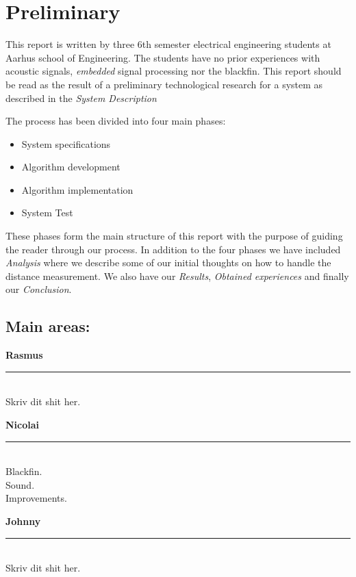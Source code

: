 \chapter{Preliminary}
This report is written by three 6th semester electrical engineering students at Aarhus school of Engineering. The students have no prior experiences with acoustic signals, \textit{embedded} signal processing nor the blackfin. This report should be read as the result of a preliminary technological research for a system as described in the \textit{System Description}

The process has been divided into four main phases:
\begin{itemize}
\item System specifications
\item Algorithm development
\item Algorithm implementation
\item System Test
\end{itemize}

These phases form the main structure of this report with the purpose of guiding the reader through our process. In addition to the four phases we have included \textit{Analysis} where we describe some of our initial thoughts on how to handle the distance measurement. We also have our \textit{Results}, \textit{Obtained experiences} and finally our \textit{Conclusion}.

\section{Main areas:}
\begin{minipage}{0.31\columnwidth}
\begin{center}
\textbf{Rasmus}
\end{center}
\hrule
\ \\
Skriv dit shit her.
\end{minipage}
\hfill
\vline
\hfill
\begin{minipage}{0.31\columnwidth}
\begin{center}
\textbf{Nicolai}
\end{center}
\hrule
\ \\
Blackfin.\\
Sound.\\
Improvements.\\
\end{minipage}
\hfill
\vline
\hfill
\begin{minipage}{0.31\columnwidth}
\begin{center}
\textbf{Johnny}
\end{center}
\hrule
\ \\
Skriv dit shit her.
\end{minipage}